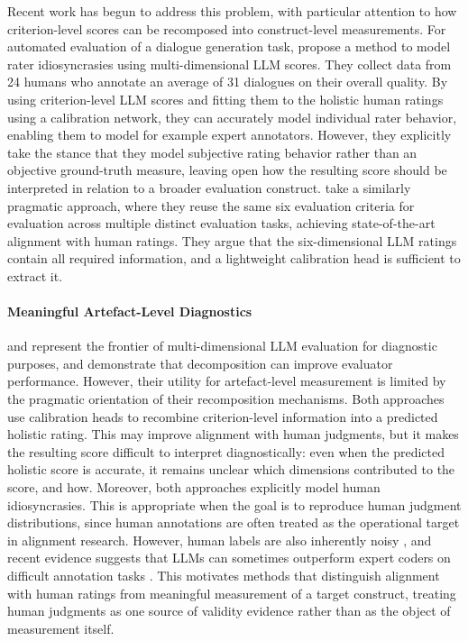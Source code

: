 Recent work has begun to address this problem, with particular attention to how criterion-level scores can be recomposed into construct-level measurements. For automated evaluation of a dialogue generation task, \citet{hashemi_llm-rubric_2024} propose a method to model rater idiosyncrasies using multi-dimensional LLM scores. They collect data from 24 humans who annotate an average of 31 dialogues on their overall quality. By using criterion-level LLM scores and fitting them to the holistic human ratings using a calibration network, they can accurately model individual rater behavior, enabling them to model for example expert annotators. 
However, they explicitly take the stance that they model subjective rating behavior rather than an objective ground-truth measure, leaving open how the resulting score should be interpreted in relation to a broader evaluation construct. \citet{kolaSAJASimpleApproach2026} take a similarly pragmatic approach, where they reuse the same six evaluation criteria for evaluation across multiple distinct evaluation tasks, achieving state-of-the-art alignment with human ratings. They argue that the six-dimensional LLM ratings contain all required information, and a lightweight calibration head is sufficient to extract it. 

\paragraph{Meaningful Artefact-Level Diagnostics}

\citet{hashemi_llm-rubric_2024} and \citet{kolaSAJASimpleApproach2026} represent the frontier of multi-dimensional LLM evaluation for diagnostic purposes, and demonstrate that decomposition can improve evaluator performance. However, their utility for artefact-level measurement is limited by the pragmatic orientation of their recomposition mechanisms. Both approaches use calibration heads to recombine criterion-level information into a predicted holistic rating. This may improve alignment with human judgments, but it makes the resulting score difficult to interpret diagnostically: even when the predicted holistic score is accurate, it remains unclear which dimensions contributed to the score, and how. Moreover, both approaches explicitly model human idiosyncrasies. This is appropriate when the goal is to reproduce human judgment distributions, since human annotations are often treated as the operational target in alignment research. However, human labels are also inherently noisy \citep{zhaoChallengesTrustworthyHuman}, and recent evidence suggests that LLMs can sometimes outperform expert coders on difficult annotation tasks \citep{tornbergLargeLanguageModels2025}. This motivates methods that distinguish alignment with human ratings from meaningful measurement of a target construct, treating human judgments as one source of validity evidence rather than as the object of measurement itself.


